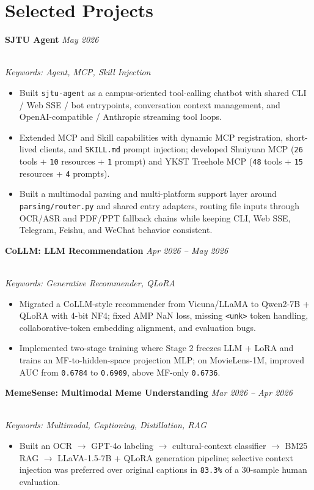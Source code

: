 \documentclass[a4paper,10pt]{extarticle}
\newcommand{\project}[2]{%
  \textbf{#1} \hfill \textit{#2}
}
\newcommand{\projectkeywords}[1]{%
  \\[-2pt]{\footnotesize\textit{Keywords: #1}}
}
\begin{document}
\section{Selected Projects}
\project{SJTU Agent}{May 2026}
\projectkeywords{Agent, MCP, Skill Injection}
\vspace{-0.85em}
{\small
\begin{itemize}
  \item Built \texttt{sjtu-agent} as a campus-oriented tool-calling chatbot with shared CLI / Web SSE / bot entrypoints, conversation context management, and OpenAI-compatible / Anthropic streaming tool loops.
  \item Extended MCP and Skill capabilities with dynamic MCP registration, short-lived clients, and \texttt{SKILL.md} prompt injection; developed Shuiyuan MCP (\texttt{26} tools + \texttt{10} resources + \texttt{1} prompt) and YKST Treehole MCP (\texttt{48} tools + \texttt{15} resources + \texttt{4} prompts).
  \item Built a multimodal parsing and multi-platform support layer around \texttt{parsing/router.py} and shared entry adapters, routing file inputs through OCR/ASR and PDF/PPT fallback chains while keeping CLI, Web SSE, Telegram, Feishu, and WeChat behavior consistent.
\end{itemize}
}

\project{CoLLM: LLM Recommendation}{Apr 2026 -- May 2026}
\projectkeywords{Generative Recommender, QLoRA}
\vspace{-0.85em}
{\small
\begin{itemize}
  \item Migrated a CoLLM-style recommender from Vicuna/LLaMA to Qwen2-7B + QLoRA with 4-bit NF4; fixed AMP NaN loss, missing \texttt{<unk>} token handling, collaborative-token embedding alignment, and evaluation bugs.
  \item Implemented two-stage training where Stage 2 freezes LLM + LoRA and trains an MF-to-hidden-space projection MLP; on MovieLens-1M, improved AUC from \texttt{0.6784} to \texttt{0.6909}, above MF-only \texttt{0.6736}.
\end{itemize}
}

\project{MemeSense: Multimodal Meme Understanding}{Mar 2026 -- Apr 2026}
\projectkeywords{Multimodal, Captioning, Distillation, RAG}
\vspace{-0.85em}
{\small
\begin{itemize}
  \item Built an OCR \(\rightarrow\) GPT-4o labeling \(\rightarrow\) cultural-context classifier \(\rightarrow\) BM25 RAG \(\rightarrow\) LLaVA-1.5-7B + QLoRA generation pipeline; selective context injection was preferred over original captions in \texttt{83.3\%} of a 30-sample human evaluation.
\end{itemize}
}
\end{document}
